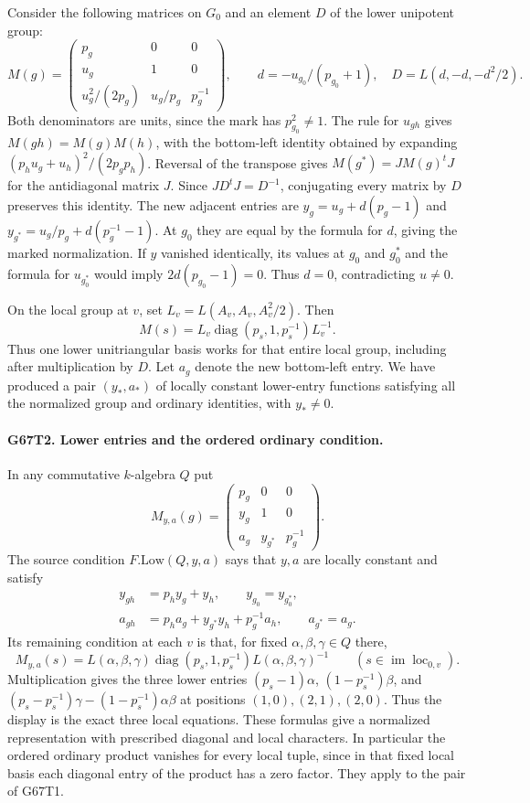 Consider the following matrices on $G_0$ and an element $D$ of
the lower unipotent group:
\[
 M(g)=
 \begin{pmatrix}p_g&0&0\\u_g&1&0\\
 u_g^2/(2p_g)&u_g/p_g&p_g^{-1}\end{pmatrix},
 \qquad
 d=-u_{g_0}/(p_{g_0}+1),\quad D=L(d,-d,-d^2/2).
\]
Both denominators are units, since the mark has $p_{g_0}^2\ne1$.
The rule for $u_{gh}$ gives $M(gh)=M(g)M(h)$, with the bottom-left
identity obtained by expanding $(p_hu_g+u_h)^2/(2p_gp_h)$.
Reversal of the transpose gives $M(g^*)=JM(g)^tJ$ for the
antidiagonal matrix $J$. Since $JD^tJ=D^{-1}$, conjugating every
matrix by $D$ preserves this identity. The new adjacent entries
are $y_g=u_g+d(p_g-1)$ and $y_{g^*}=u_g/p_g+d(p_g^{-1}-1)$.
At $g_0$ they are equal by the formula for $d$, giving the marked
normalization. If $y$ vanished identically, its values at $g_0$
and $g_0^*$ and the formula for $u_{g_0^*}$ would imply
$2d(p_{g_0}-1)=0$. Thus $d=0$, contradicting $u\ne0$.

On the local group at $v$, set $L_v=L(A_v,A_v,A_v^2/2)$. Then
\[
             M(s)=L_v\operatorname{diag}(p_s,1,p_s^{-1})L_v^{-1}.
\]
Thus one lower unitriangular basis
works for that entire local group, including after multiplication
by $D$. Let $a_g$ denote the new bottom-left entry. We have produced
a pair $(y_*,a_*)$ of locally constant lower-entry functions
satisfying all the normalized group and ordinary identities,
with $y_*\ne0$.

\paragraph{G67T2. Lower entries and the ordered ordinary condition.}
In any commutative $k$-algebra $Q$ put
\[
 M_{y,a}(g)=\begin{pmatrix}p_g&0&0\\y_g&1&0\\
              a_g&y_{g^*}&p_g^{-1}\end{pmatrix}.
\]
The source condition $F.\mathrm{Low}(Q,y,a)$ says that $y,a$ are
locally constant and satisfy
\[
 \begin{aligned}
 y_{gh}&=p_h y_g+y_h,\qquad y_{g_0}=y_{g_0^*},\\
 a_{gh}&=p_h a_g+y_{g^*}y_h+p_g^{-1}a_h,\qquad a_{g^*}=a_g .
 \end{aligned}
\]
Its remaining condition at each $v$ is that, for fixed
$\alpha,\beta,\gamma\in Q$ there,
\[
 M_{y,a}(s)=L(\alpha,\beta,\gamma)
       \operatorname{diag}(p_s,1,p_s^{-1})L(\alpha,\beta,\gamma)^{-1}
                    \qquad(s\in\operatorname{im}\operatorname{loc}_{0,v}).
\]
Multiplication gives the three lower entries
$(p_s-1)\alpha$, $(1-p_s^{-1})\beta$, and
$(p_s-p_s^{-1})\gamma-(1-p_s^{-1})\alpha\beta$ at positions
$(1,0),(2,1),(2,0)$. Thus the display is the exact three local
equations. These formulas give a normalized representation with
prescribed diagonal and local characters. In particular the ordered
ordinary product vanishes for every local tuple, since in that fixed
local basis each diagonal entry of the product has a zero factor.
They apply to the pair of G67T1.

